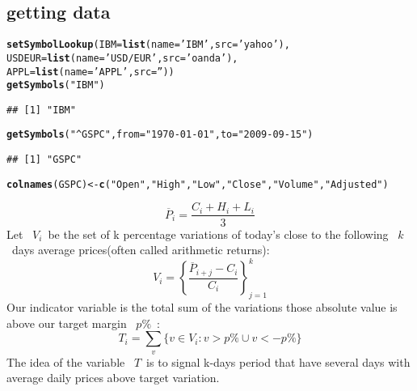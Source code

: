 \documentclass{article}\usepackage[]{graphicx}\usepackage[]{color}
\makeatletter
\newcommand{\hlstr}[1]{\textcolor[rgb]{0.192,0.494,0.8}{#1}}%
\newcommand{\hlstd}[1]{\textcolor[rgb]{0.345,0.345,0.345}{#1}}%
\newcommand{\hlkwb}[1]{\textcolor[rgb]{0.69,0.353,0.396}{#1}}%
\newcommand{\hlkwc}[1]{\textcolor[rgb]{0.333,0.667,0.333}{#1}}%
\newcommand{\hlkwd}[1]{\textcolor[rgb]{0.737,0.353,0.396}{\textbf{#1}}}%
\newenvironment{kframe}{%
 \def\at@end@of@kframe{}%
 \ifinner\ifhmode%
  \def\at@end@of@kframe{\end{minipage}}%
  \begin{minipage}{\columnwidth}%
 \fi\fi%
 \def\FrameCommand##1{\hskip\@totalleftmargin \hskip-\fboxsep
 \colorbox{shadecolor}{##1}\hskip-\fboxsep
     \hskip-\linewidth \hskip-\@totalleftmargin \hskip\columnwidth}%
 \MakeFramed {\advance\hsize-\width
   \@totalleftmargin\z@ \linewidth\hsize
   \@setminipage}}%
 {\par\unskip\endMakeFramed%
 \at@end@of@kframe}
\newenvironment{knitrout}{}{} %
\makeatother
\begin{document}
\subsection{getting data}
\begin{knitrout}
\color{fgcolor}\begin{kframe}
\begin{alltt}
\hlkwd{setSymbolLookup}\hlstd{(}\hlkwc{IBM} \hlstd{=} \hlkwd{list}\hlstd{(}\hlkwc{name} \hlstd{=} \hlstr{'IBM'}\hlstd{,} \hlkwc{src} \hlstd{=} \hlstr{'yahoo'}\hlstd{),}
                \hlkwc{USDEUR} \hlstd{=} \hlkwd{list}\hlstd{(}\hlkwc{name} \hlstd{=} \hlstr{'USD/EUR'}\hlstd{,} \hlkwc{src} \hlstd{=} \hlstr{'oanda'}\hlstd{),}
                \hlkwc{APPL} \hlstd{=} \hlkwd{list}\hlstd{(}\hlkwc{name} \hlstd{=} \hlstr{'APPL'}\hlstd{,} \hlkwc{src} \hlstd{=} \hlstr{''}\hlstd{))}
\hlkwd{getSymbols}\hlstd{(}\hlstr{"IBM"}\hlstd{)}
\end{alltt}
\begin{verbatim}
## [1] "IBM"
\end{verbatim}
\begin{alltt}
\hlkwd{getSymbols}\hlstd{(}\hlstr{"^GSPC"}\hlstd{,}\hlkwc{from} \hlstd{=} \hlstr{"1970-01-01"}\hlstd{,} \hlkwc{to} \hlstd{=} \hlstr{"2009-09-15"}\hlstd{)}
\end{alltt}
\begin{verbatim}
## [1] "GSPC"
\end{verbatim}
\begin{alltt}
\hlkwd{colnames}\hlstd{(GSPC)} \hlkwb{<-} \hlkwd{c}\hlstd{(}\hlstr{"Open"}\hlstd{,} \hlstr{"High"}\hlstd{,} \hlstr{"Low"}\hlstd{,} \hlstr{"Close"}\hlstd{,} \hlstr{"Volume"}\hlstd{,} \hlstr{"Adjusted"}\hlstd{)}
\end{alltt}
\end{kframe}
\end{knitrout}
$$\overline{P}_i = \frac{C_i+H_i+L_i}{3}$$
Let ~$V_i$~be the set of k percentage variations of today's close to the following ~$k$~days average prices(often called arithmetic returns):
$$V_i = \left\{\frac{\overline{P}_{i+j}-C_i}{C_i}\right\}_{j=1}^k$$
Our indicator variable is the total sum of the variations those absolute value is above our target
margin ~$p\%$~:
$$T_i = \sum_v\{v\in V_i:v>p\%\cup v<-p\%\}$$
The idea of the variable ~$T$~is to signal k-days period that have several days with average daily prices above target variation.
\end{document}

